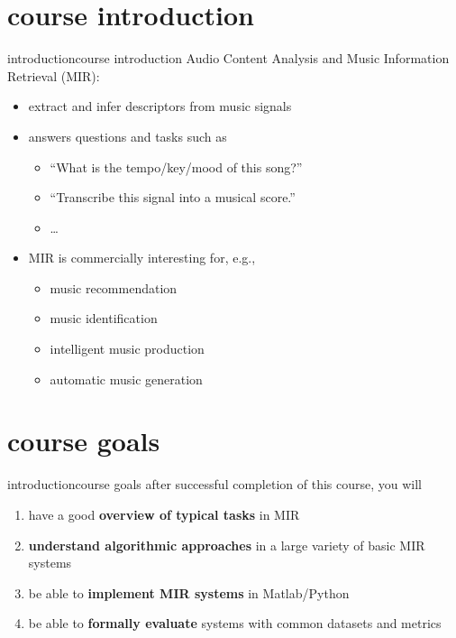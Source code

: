     \section[course intro]{course introduction}
        \begin{frame}{introduction}{course introduction}
            Audio Content Analysis and Music Information Retrieval (MIR):
            \begin{itemize}
                \item   extract and infer descriptors from music signals
                \item   answers questions and tasks such as
                    \begin{itemize}
                        \item   ``What is the tempo/key/mood of this song?''
                        \item   ``Transcribe this signal into a musical score.''
                        \item   \ldots
                    \end{itemize}
                \bigskip
                \item<2->   MIR is commercially interesting for, e.g.,
                    \begin{itemize}
                        \item   music recommendation
                        \item   music identification
                        \item   intelligent music production
                        \item   automatic music generation
                    \end{itemize}
            \end{itemize}
        \end{frame}
        
    \section[course goals]{course goals}
        \begin{frame}{introduction}{course goals}
            after successful completion of this course, you will
            \smallskip
            \begin{enumerate}
                \item   have a good \textbf{overview of typical tasks} in MIR
                \item   \textbf{understand algorithmic approaches} in a large variety of basic MIR systems
                \item   be able to \textbf{implement MIR systems} in Matlab/Python
                \item   be able to \textbf{formally evaluate} systems with common datasets and metrics
            \end{enumerate}
        \end{frame}
        

